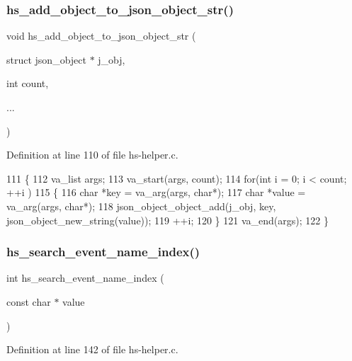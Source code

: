 \subsubsection{\texorpdfstring{hs\+\_\+add\+\_\+object\+\_\+to\+\_\+json\+\_\+object\+\_\+str()}{hs\_add\_object\_to\_json\_object\_str()}}
{\footnotesize\ttfamily void hs\+\_\+add\+\_\+object\+\_\+to\+\_\+json\+\_\+object\+\_\+str (\begin{DoxyParamCaption}\item[{struct json\+\_\+object $\ast$}]{j\+\_\+obj,  }\item[{int}]{count,  }\item[{}]{... }\end{DoxyParamCaption})}



Definition at line 110 of file hs-\/helper.\+c.


\begin{DoxyCode}
111 \{
112     va\_list args;
113     va\_start(args, count);
114     \textcolor{keywordflow}{for}(\textcolor{keywordtype}{int} i = 0; i < count; ++i )
115     \{
116         \textcolor{keywordtype}{char} *key = va\_arg(args, \textcolor{keywordtype}{char}*);
117         \textcolor{keywordtype}{char} *value = va\_arg(args, \textcolor{keywordtype}{char}*);
118         json\_object\_object\_add(j\_obj, key, json\_object\_new\_string(value));
119         ++i;
120     \}
121     va\_end(args);
122 \}
\end{DoxyCode}
\mbox{\label{hs-helper_8h_a2ff1b894941c3b461ca8119079c4146a}} 
\subsubsection{\texorpdfstring{hs\+\_\+search\+\_\+event\+\_\+name\+\_\+index()}{hs\_search\_event\_name\_index()}}
{\footnotesize\ttfamily int hs\+\_\+search\+\_\+event\+\_\+name\+\_\+index (\begin{DoxyParamCaption}\item[{const char $\ast$}]{value }\end{DoxyParamCaption})}



Definition at line 142 of file hs-\/helper.\+c.



